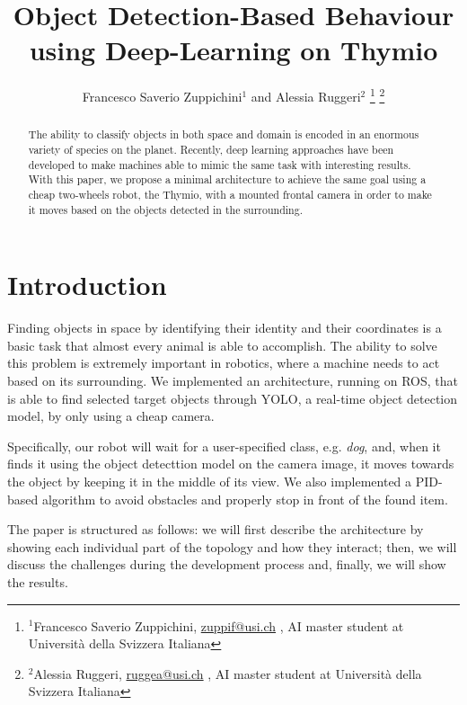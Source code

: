 \documentclass[letterpaper, 10 pt, conference]{ieeeconf}  %
\title{\LARGE \bf
Object Detection-Based Behaviour using Deep-Learning on Thymio
}
\author{Francesco Saverio Zuppichini$^{1}$ and Alessia Ruggeri$^{2}$%
\thanks{$^{1}$Francesco Saverio Zuppichini, \href{mailto:zuppif@usi.ch}{zuppif@usi.ch} , AI master student at Università della Svizzera Italiana }%
\thanks{$^{2}$Alessia Ruggeri, \href{mailto:ruggea@usi.ch}{ruggea@usi.ch} , AI master student at Università della Svizzera Italiana }%
}
\begin{document}
\maketitle
\thispagestyle{empty}
\pagestyle{empty}


\begin{abstract}
The ability to classify objects in both space and domain is encoded in an enormous variety of species on the planet. Recently, deep learning approaches have been developed to make machines able to mimic the same task with interesting results. With this paper, we propose a minimal architecture to achieve the same goal using a cheap two-wheels robot, the Thymio, with a mounted frontal camera in order to make it moves based on the objects detected in the surrounding. 
\end{abstract}

\section{Introduction}
Finding objects in space by identifying their identity and their coordinates is a basic task that almost every animal is able to accomplish. The ability to solve this problem is extremely important in robotics, where a machine needs to act based on its surrounding.  We implemented an architecture, running on ROS, that is able to find selected target objects through YOLO, a real-time object detection model,  by only using a cheap camera.

Specifically, our robot will wait for a user-specified class, e.g. \emph{dog}, and, when it finds it using the object detecttion model on the camera image, it moves towards the object by keeping it in the middle of its view. We also implemented a PID-based algorithm to avoid obstacles and properly stop in front of the found item.

The paper is structured as follows: we will first describe the architecture by showing each individual part of the topology and how they interact; then, we will discuss the challenges during the development process and, finally, we will show the results.
\end{document}
